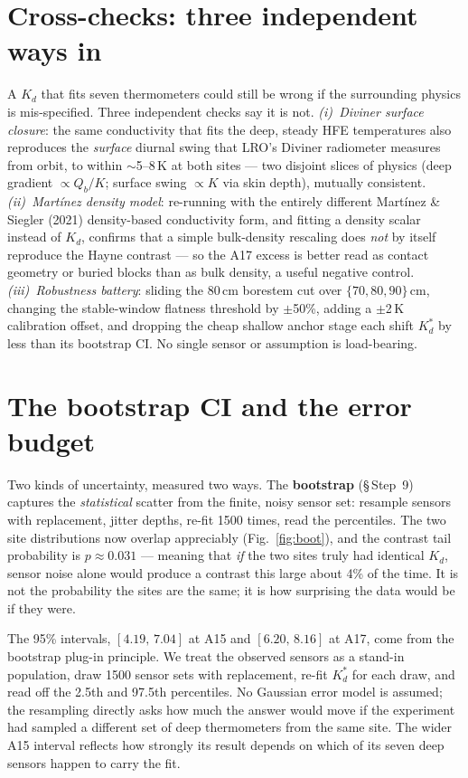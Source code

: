 \documentclass[11pt]{report}
\begin{document}
\section{Cross-checks: three independent ways in}\label{sec:crosschecks}

A $K_d$ that fits seven thermometers could still be wrong if the surrounding
physics is mis-specified. Three independent checks say it is not.
\emph{(i)~Diviner surface closure}: the same conductivity that fits the deep,
steady HFE temperatures also reproduces the \emph{surface} diurnal swing that
LRO's Diviner radiometer measures from orbit, to within $\sim$5--8\,K at both
sites --- two disjoint slices of physics (deep gradient $\propto Q_b/K$; surface
swing $\propto K$ via skin depth), mutually consistent. \emph{(ii)~Martínez
density model}: re-running with the entirely different Martínez \& Siegler (2021)
density-based conductivity form, and fitting a density scalar instead of $K_d$,
confirms that a simple bulk-density rescaling does \emph{not} by itself reproduce
the Hayne contrast --- so the A17 excess is better read as contact geometry or
buried blocks than as bulk density, a useful negative control. \emph{(iii)~Robustness
battery}: sliding the 80\,cm borestem cut over $\{70,80,90\}$\,cm, changing the
stable-window flatness threshold by $\pm$50\%, adding a $\pm$2\,K calibration
offset, and dropping the cheap shallow anchor stage each shift $K_d^{*}$ by less
than its bootstrap CI. No single sensor or assumption is load-bearing.

\section{The bootstrap CI and the error budget}\label{sec:resultstats}

Two kinds of uncertainty, measured two ways. The \textbf{bootstrap} (\S\,Step~9)
captures the \emph{statistical} scatter from the finite, noisy sensor set:
resample sensors with replacement, jitter depths, re-fit 1500 times, read the
percentiles. The two site distributions now overlap appreciably (Fig.~\ref{fig:boot}), and
the contrast tail probability is $p\approx0.031$ --- meaning that \emph{if} the
two sites truly had identical $K_d$, sensor noise alone would produce a contrast
this large about 4\% of the time. It is not the probability the sites are the
same; it is how surprising the data would be if they were.

The 95\% intervals, $[4.19,\,7.04]$ at A15 and $[6.20,\,8.16]$ at A17,
come from the bootstrap plug-in principle. We treat the observed sensors as a
stand-in population, draw 1500 sensor sets with replacement, re-fit $K_d^{*}$
for each draw, and read off the 2.5th and 97.5th percentiles. No Gaussian error
model is assumed; the resampling directly asks how much the answer would move if
the experiment had sampled a different set of deep thermometers from the same
site. The wider A15 interval reflects how strongly its result depends on which
of its seven deep sensors happen to carry the fit.
\end{document}
